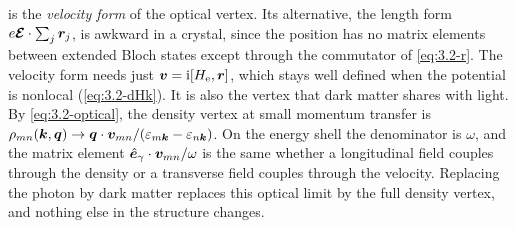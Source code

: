  is the \emph{velocity form} of the optical vertex. Its alternative, the length form $e\bm{\mathcal{E}}\cdot\sum_j\bm{r}_j$, is awkward in a crystal, since the position has no matrix elements between extended Bloch states except through the commutator of \cref{eq:3.2-r}. The velocity form needs just $\bm{v} = \mathrm{i}[H_{\mathrm{e}},\bm{r}]$, which stays well defined when the potential is nonlocal (\cref{eq:3.2-dHk}). It is also the vertex that dark matter shares with light. By \cref{eq:3.2-optical}, the density vertex at small momentum transfer is $\rho_{mn}(\bm{k},\bm{q}) \to \bm{q}\cdot\bm{v}_{mn}/(\varepsilon_{m\bm{k}} - \varepsilon_{n\bm{k}})$. On the energy shell the denominator is $\omega$, and the matrix element $\hat{\bm{e}}_\gamma\cdot\bm{v}_{mn}/\omega$ is the same whether a longitudinal field couples through the density or a transverse field couples through the velocity. Replacing the photon by dark matter replaces this optical limit by the full density vertex, and nothing else in the structure changes.

